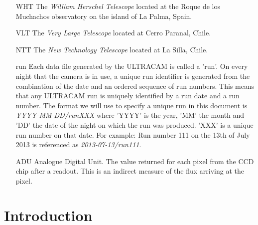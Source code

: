 \documentclass[11pt,a4paper]{report}      %
\begin{document}
\begin{thesisabbreviations}       %

	\begin{itemize}
		\item[WHT]The \emph{William Herschel Telescope} located at the Roque de los Muchachos observatory on the island of La Palma, Spain. 
		\item[VLT]The \emph{Very Large Telescope} located at Cerro Paranal, Chile. 
		\item[NTT]The \emph{New Technology Telescope} located at La Silla, Chile.
		\item[run]Each data file generated by the ULTRACAM is called a 'run'. On every night that the camera is in use, a unique run identifier is generated from the combination of the date and an ordered sequence of run numbers. This means that any ULTRACAM run is uniquely identified by a run date and a run number. The format we will use to specify a unique run in this document is \emph{YYYY-MM-DD/runXXX} where 'YYYY' is the year, 'MM'  the month and 'DD' the date of the night on which the run was produced. 'XXX' is a unique run number on that date. For example: Run number 111 on the 13th of July 2013 is referenced as \emph{2013-07-13/run111}. 
		\item[ADU]Analogue Digital Unit. The value returned for each pixel from the CCD chip after a readout. This is an indirect measure of the flux arriving at the pixel.  
	\end{itemize}
\end{thesisabbreviations}         %



\chapter{Introduction}\label{chap:introduction}

\end{document}
